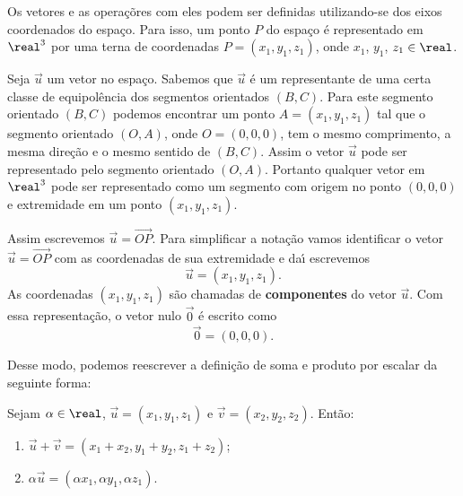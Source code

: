 Os vetores e as opera\c{c}\~ores com eles podem ser definidas utilizando-se dos eixos coordenados do espa\c{c}o. Para isso, um ponto $P$ do espa\c{c}o \'e representado em $\real^3$ por uma terna de coordenadas $P = (x_1, y_1,z_1)$, onde $x_1$, $y_1$, $z_1 \in \real$.

Seja $\vec{u}$ um vetor no espa\c{c}o. Sabemos que $\vec{u}$ \'e um representante de uma certa classe de equipol\^encia dos segmentos orientados $(B,C)$. Para este segmento orientado $(B,C)$ podemos encontrar um ponto $A = (x_1, y_1,z_1)$ tal que o segmento orientado $(O,A)$, onde $O = (0,0,0)$, tem o mesmo comprimento, a mesma dire\c{c}\~ao e o mesmo sentido de $(B,C)$. Assim o vetor $\vec{u}$ pode ser representado pelo segmento orientado $(O,A)$. Portanto qualquer vetor em $\real^3$ pode ser representado como um segmento com origem no ponto $(0,0,0)$ e extremidade em um ponto $(x_1,y_1,z_1)$.


Assim escrevemos $\vec{u} = \vec{OP}$. Para simplificar a nota\c{c}\~ao vamos identificar o vetor $\vec{u} = \vec{OP}$ com as coordenadas de sua extremidade e da{\'\i} escrevemos
\[
  \vec{u} = (x_1,y_1,z_1).
\]
As coordenadas $(x_1,y_1,z_1)$ s\~ao chamadas de \textbf{componentes} do vetor $\vec{u}$. Com essa representa\c{c}\~ao, o vetor nulo $\vec{0}$ \'e escrito como
\[
  \vec{0} = (0,0,0).
\]

Desse modo, podemos reescrever a defini\c{c}\~ao de soma e produto por escalar da seguinte forma:
\begin{definicao}
  Sejam $\alpha \in \real$, $\vec{u} = (x_1, y_1,z_1)$ e $\vec{v} = (x_2, y_2,z_2)$. Ent\~ao:
  \begin{enumerate}
    \item $\vec{u} + \vec{v} = (x_1 + x_2, y_1 + y_2,z_1 + z_2)$;
    \item $\alpha \vec{u} = (\alpha x_1, \alpha y_1, \alpha z_1)$.
  \end{enumerate}
\end{definicao}


